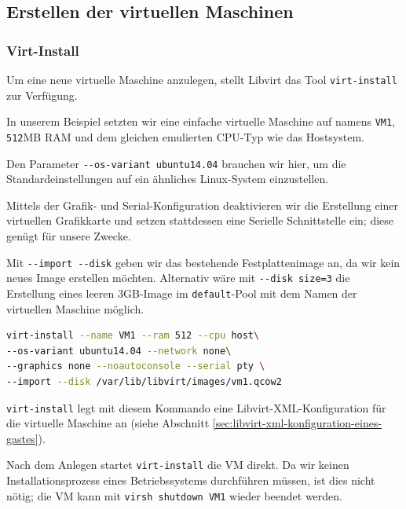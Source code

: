 



\subsection{Erstellen der virtuellen Maschinen}


\subsubsection{Virt-Install}\label{sec:virt-install}
Um eine neue virtuelle Maschine anzulegen, stellt Libvirt das Tool \lstinline|virt-install| zur Verfügung.

In unserem Beispiel setzten wir eine einfache virtuelle Maschine auf namens \lstinline|VM1|, \lstinline|512|MB RAM und dem gleichen emulierten CPU-Typ wie das Hostsystem.

Den Parameter \lstinline|--os-variant ubuntu14.04| brauchen wir hier, um die Standardeinstellungen auf ein ähnliches Linux-System einzustellen.

Mittels der Grafik- und Serial-Konfiguration deaktivieren wir die Erstellung einer virtuellen Grafikkarte und setzen stattdessen eine Serielle Schnittstelle ein; diese genügt für unsere Zwecke.

Mit \lstinline|--import --disk| geben wir das bestehende Festplattenimage an, da wir kein neues Image erstellen möchten. Alternativ wäre mit \lstinline|--disk size=3| die Erstellung eines leeren 3GB-Image im \lstinline|default|-Pool mit dem Namen der virtuellen Maschine möglich.

\begin{lstlisting}[language=bash]
virt-install --name VM1 --ram 512 --cpu host\
--os-variant ubuntu14.04 --network none\
--graphics none --noautoconsole --serial pty \
--import --disk /var/lib/libvirt/images/vm1.qcow2
\end{lstlisting}

\lstinline|virt-install| legt mit diesem Kommando eine Libvirt-XML-Konfiguration für die virtuelle Maschine an (siehe Abschnitt \ref{sec:libvirt-xml-konfiguration-eines-gastes}).

Nach dem Anlegen startet \lstinline|virt-install| die VM direkt. Da wir keinen Installationsprozess eines Betriebssystems durchführen müssen, ist dies nicht nötig; die VM kann mit \lstinline|virsh shutdown VM1| wieder beendet werden.

